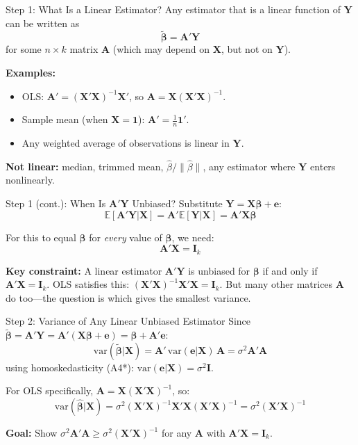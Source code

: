 \documentclass[aspectratio=169, handout]{beamer}
\numberwithin{equation}{section}
\begin{document}
\begin{frame}{Step 1: What Is a Linear Estimator?}
Any estimator that is a linear function of $\bm{Y}$ can be written as
$$\bm{\tilde{\beta}}=\bm{A}'\bm{Y}$$
for some $n\times k$ matrix $\bm{A}$ (which may depend on $\bm{X}$, but not on $\bm{Y}$).
\pause

\medskip
\textbf{Examples:}
\begin{itemize}
\item OLS: $\bm{A}'=(\bm{X'X})^{-1}\bm{X}'$, so $\bm{A}=\bm{X}(\bm{X'X})^{-1}$.
\item Sample mean (when $\bm{X}=\bm{1}$): $\bm{A}'=\frac{1}{n}\bm{1}'$.
\item Any weighted average of observations is linear in $\bm{Y}$.
\end{itemize}
\pause

\medskip
\textbf{Not linear:} median, trimmed mean, $\hat{\beta}/\|\hat{\beta}\|$, any estimator where $\bm{Y}$ enters nonlinearly.
\end{frame}


\begin{frame}{Step 1 (cont.): When Is $\bm{A'Y}$ Unbiased?}
Substitute $\bm{Y}=\bm{X\beta}+\bm{e}$:
$$\mathbb{E}[\bm{A'Y}|\bm{X}]=\bm{A}'\mathbb{E}[\bm{Y}|\bm{X}]=\bm{A}'\bm{X\beta}$$
\pause

For this to equal $\bm{\beta}$ for \emph{every} value of $\bm{\beta}$, we need:
$$\bm{A}'\bm{X}=\bm{I}_k$$
\pause

\begin{tcolorbox}[colback=blue!5, colframe=blue!50]
\textbf{Key constraint:} A linear estimator $\bm{A'Y}$ is unbiased for $\bm{\beta}$ if and only if $\bm{A'X}=\bm{I}_k$.  OLS satisfies this: $(\bm{X'X})^{-1}\bm{X}'\bm{X}=\bm{I}_k$. But many other matrices $\bm{A}$ do too---the question is which gives the smallest variance.
\end{tcolorbox}
\end{frame}


\begin{frame}{Step 2: Variance of Any Linear Unbiased Estimator}
Since $\bm{\tilde{\beta}}=\bm{A'Y}=\bm{A}'(\bm{X\beta}+\bm{e})=\bm{\beta}+\bm{A}'\bm{e}$:
$$\text{var}(\bm{\tilde{\beta}}|\bm{X})=\bm{A}'\,\text{var}(\bm{e}|\bm{X})\,\bm{A}=\sigma^2\bm{A'A}$$
using homoskedasticity (A4*): $\text{var}(\bm{e}|\bm{X})=\sigma^2\bm{I}$.
\pause

\medskip
For OLS specifically, $\bm{A}=\bm{X}(\bm{X'X})^{-1}$, so:
$$\text{var}(\hat{\bm{\beta}}|\bm{X})=\sigma^2(\bm{X'X})^{-1}\bm{X'X}(\bm{X'X})^{-1}=\sigma^2(\bm{X'X})^{-1}$$
\pause

\medskip
\textbf{Goal:} Show $\sigma^2\bm{A'A}\geq\sigma^2(\bm{X'X})^{-1}$ for any $\bm{A}$ with $\bm{A'X}=\bm{I}_k$.
\end{frame}
\end{document}
